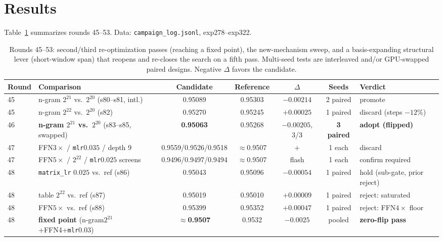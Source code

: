 \documentclass{article}
\begin{document}
\section{Results}
\label{sec:results}

Table~\ref{tab:results} summarizes rounds 45--53. Data: \texttt{campaign\_log.jsonl}, exp278--exp322.

\begin{table}[t]
\caption{Rounds 45--53: second/third re-optimization passes (reaching a fixed point), the new-mechanism sweep, and a basis-expanding structural lever (short-window span) that reopens and re-closes the search on a fifth pass. Multi-seed tests are interleaved and/or GPU-swapped paired designs. Negative $\Delta$ favors the candidate.}
\label{tab:results}
\vskip 0.15in
\begin{center}
\begin{scriptsize}
\setlength{\tabcolsep}{2.2pt}
\begin{tabular}{llccccl}
\toprule
Round & Comparison & Candidate & Reference & $\Delta$ & Seeds & Verdict \\
\midrule
45 & n-gram $2^{21}$ vs.\ $2^{20}$ (s80--s81, intl.) & 0.95089 & 0.95303 & $-0.00214$ & 2 paired & promote \\
45 & n-gram $2^{22}$ vs.\ $2^{20}$ (s82) & 0.95270 & 0.95245 & $+0.00025$ & 1 paired & discard (steps $-12\%$) \\
46 & \textbf{n-gram $2^{21}$ vs.\ $2^{20}$} (s83--s85, swapped) & \textbf{0.95063} & 0.95268 & $-0.00205$, 3/3 & \textbf{3 paired} & \textbf{adopt (flipped)} \\
\midrule
47 & FFN$3\times$ / \texttt{mlr}$0.035$ / depth 9 & 0.9559/0.9526/0.9518 & $\approx$0.9507 & $+$ & 1 each & discard \\
47 & FFN$5\times$ / $2^{22}$ / \texttt{mlr}$0.025$ screens & 0.9496/0.9497/0.9494 & $\approx$0.9507 & flash & 1 each & confirm required \\
48 & \texttt{matrix\_lr} $0.025$ vs.\ ref (s86) & 0.95043 & 0.95096 & $-0.00054$ & 1 paired & hold (sub-gate, prior reject) \\
48 & table $2^{22}$ vs.\ ref (s87) & 0.95019 & 0.95010 & $+0.00009$ & 1 paired & reject: saturated \\
48 & FFN$5\times$ vs.\ ref (s88) & 0.95399 & 0.95352 & $+0.00047$ & 1 paired & reject: FFN$4\times$ floor \\
\midrule
48 & \textbf{fixed point} (n-gram$2^{21}$+FFN4+\texttt{mlr}0.03) & \textbf{$\approx$0.9507} & 0.9532 & $-0.0025$ & pooled & \textbf{zero-flip pass} \\

\end{tabular}
\end{scriptsize}
\end{center}
\end{table}
\end{document}

